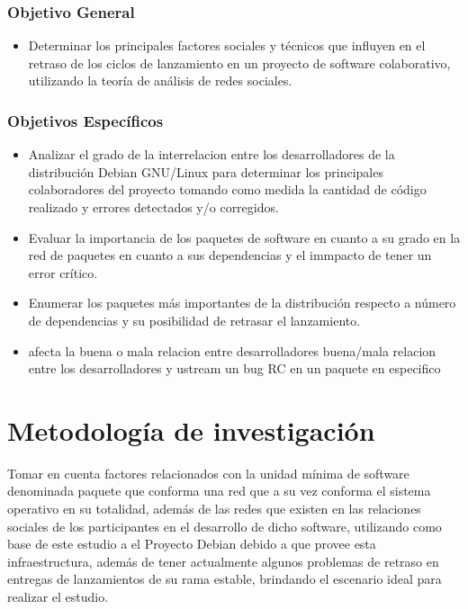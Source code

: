 \documentclass[12pt]{report}
\begin{document}
\subsection*{Objetivo General}
\begin{itemize}
\item  Determinar los  principales  factores sociales  y técnicos  que
influyen en el retraso de los  ciclos de lanzamiento en un proyecto de
software  colaborativo,  utilizando la  teoría  de  análisis de  redes
sociales.
\end{itemize}

\subsection*{Objetivos Específicos}
\begin{itemize}
\item Analizar el grado de  la interrelacion entre los desarrolladores
de la  distribución Debian  GNU/Linux para determinar  los principales
colaboradores del proyecto  tomando como medida la  cantidad de código
realizado y errores detectados y/o corregidos.
\item Evaluar la  importancia de los paquetes de software  en cuanto a
su grado  en la  red de  paquetes en  cuanto a  sus dependencias  y el
immpacto de tener un error crítico.
\item  Enumerar  los  paquetes  más  importantes  de  la  distribución
respecto  a número  de dependencias  y su  posibilidad de  retrasar el
lanzamiento.
\item %
afecta la buena o mala  relacion entre desarrolladores %
buena/mala relacion  entre los desarrolladores y  ustream %
un bug RC en un paquete en especifico

\end{itemize}

\chapter*{Metodología de investigación} %
Tomar en  cuenta  factores  relacionados con  la  unidad  mínima  de
software denominada paquete que conforma una red que a su vez conforma
el sistema operativo en su totalidad,  además de las redes que existen
en las  relaciones sociales de  los participantes en el  desarrollo de
dicho software,  utilizando como  base de este  estudio a  el Proyecto
Debian  debido a  que  provee esta  infraestructura,  además de  tener
actualmente algunos  problemas de retraso en  entregas de lanzamientos
de  su rama  estable, brindando  el escenario  ideal para  realizar el
estudio.
\end{document}
